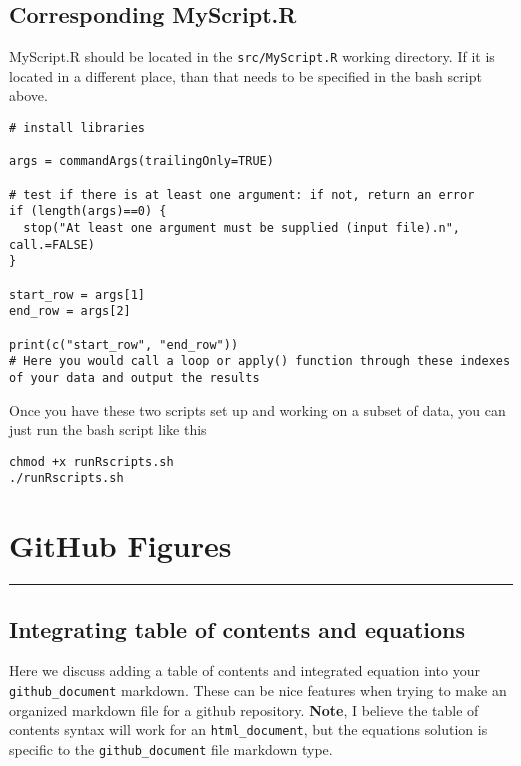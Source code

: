\documentclass[
  letterpaper,
  DIV=11,
  numbers=noendperiod]{scrreprt}
\begin{document}
\hypertarget{corresponding-myscript.r}{%
\section*{\texorpdfstring{\textbf{Corresponding
MyScript.R}}{Corresponding MyScript.R}}\label{corresponding-myscript.r}}

MyScript.R should be located in the \texttt{src/MyScript.R} working
directory. If it is located in a different place, than that needs to be
specified in the bash script above.

\begin{verbatim}
# install libraries

args = commandArgs(trailingOnly=TRUE)

# test if there is at least one argument: if not, return an error
if (length(args)==0) {
  stop("At least one argument must be supplied (input file).n", call.=FALSE)
} 

start_row = args[1]
end_row = args[2]

print(c("start_row", "end_row"))
# Here you would call a loop or apply() function through these indexes of your data and output the results
\end{verbatim}

Once you have these two scripts set up and working on a subset of data,
you can just run the bash script like this

\begin{verbatim}
chmod +x runRscripts.sh
./runRscripts.sh
\end{verbatim}

\hypertarget{github-figures}{%
\chapter{GitHub Figures}\label{github-figures}}

\begin{center}\rule{0.5\linewidth}{0.5pt}\end{center}

\hypertarget{integrating-table-of-contents-and-equations}{%
\section{Integrating table of contents and
equations}\label{integrating-table-of-contents-and-equations}}

Here we discuss adding a table of contents and integrated equation into
your \texttt{github\_document} markdown. These can be nice features when
trying to make an organized markdown file for a github repository.
\textbf{Note}, I believe the table of contents syntax will work for an
\texttt{html\_document}, but the equations solution is specific to the
\texttt{github\_document} file markdown type.
\end{document}
